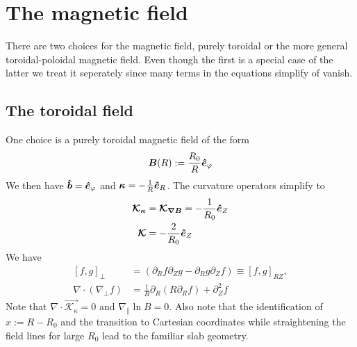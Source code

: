 \section{The magnetic field}\label{sec:magnetic}
There are two choices for the magnetic field, purely toroidal or
the more general
toroidal-poloidal magnetic field. Even though the first is a special
case of the latter we treat it seperately since many terms in the
equations simplify of vanish.
\subsection{The toroidal field}\label{sec:toroidal}
One choice is a purely toroidal magnetic field of the form %
\begin{align}
  {\boldsymbol{B}}(R) := \frac{R_0}{R} \bm{\hat{e}}_\varphi
  \label{}
\end{align}
We then have $\bm{\hat{b}} = \bm{\hat{e}}_\varphi$ and ${\boldsymbol{\kappa}} = -\frac{1}{R}\bm{\hat{e}}_R$. The curvature operators simplify to
\begin{align}
  {\boldsymbol{ \mathcal K_\kappa}} &= {\boldsymbol{ \mathcal K_{\nabla B}}} = -\frac{1}{R_0} \bm{\hat{e}}_Z \\
{\boldsymbol{ \mathcal K}} &= -\frac{2}{R_0}\bm{\hat{e}}_Z
  \label{}
\end{align}
We have
\begin{subequations}
\begin{align}
    [f, g]_\perp &= (\partial_R f\partial_Z g - \partial_R g\partial_Z f) \equiv [f, g]_{RZ}, \\
    \nabla \cdot(\nabla_\perp f) &= \frac{1}{R}\partial_R\left(R\partial_R f\right) + \partial_Z^2f
    \label{}
\end{align}
\end{subequations}
Note that $\nabla\cdot\vec{\mathcal K_{\kappa}}= 0$ and $\nabla_\parallel \ln B = 0$.
Also note that the identification of $x:=R-R_0$ and the transition to
Cartesian coordinates while straightening the field lines for large $R_0$
lead to the familiar slab geometry.

